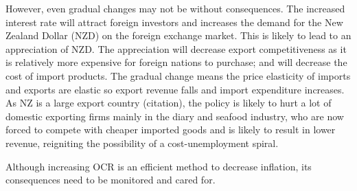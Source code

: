 \documentclass[a4paper,12pt]{article}
\begin{document}
However, even gradual changes may not be without consequences. The increased interest rate will attract foreign investors and increases the demand for the New Zealand Dollar (NZD) on the foreign exchange market. This is likely to lead to an appreciation of NZD. The appreciation will decrease export competitiveness as it is relatively more expensive for foreign nations to purchase; and will decrease the cost of import products. The gradual change means the price elasticity of imports and exports are elastic so export revenue falls and import expenditure increases. As NZ is a large export country (citation), the policy is likely to hurt a lot of domestic exporting firms mainly in the diary and seafood industry, who are now forced to compete with cheaper imported goods and is likely to result in lower revenue, reigniting the possibility of a cost-unemployment spiral.

Although increasing OCR is an efficient method to decrease inflation, its consequences need to be monitored and cared for.




\end{document}
